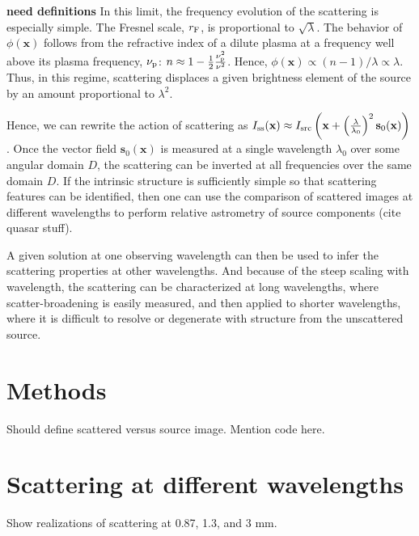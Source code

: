 \documentclass[11pt,preprint]{aastex}
\begin{document}
{\bf need definitions} In this limit, the frequency evolution of the scattering is especially simple. The Fresnel scale, $r_{\rm F}$, is proportional to $\sqrt{\lambda}$. The behavior of $\phi(\textbf{x})$ follows from the refractive index of a dilute plasma at a frequency well above its plasma frequency, $\nu_{\rm p}$: $n \approx 1 - \frac{1}{2} \frac{\nu_{\rm p}^2}{\nu^2}$. Hence, $\phi(\textbf{x}) \propto (n-1)/\lambda \propto \lambda$. Thus, in this regime, scattering displaces a given brightness element of the source by an amount proportional to $\lambda^2$. 

Hence, we can rewrite the action of scattering as 
$I_{\rm ss}(\textbf{x}) \approx I_{\rm src}\left( \textbf{x} + \left( \frac{\lambda}{\lambda_0} \right)^2 \textbf{s}_0(\textbf{x}) \right)$.  Once the vector 
field $\textbf{s}_0(\textbf{x})$ is measured at a single wavelength $\lambda_0$ 
over some angular domain $D$, the scattering can be inverted at all frequencies 
over the same domain $D$.  If the intrinsic structure is sufficiently simple so 
that scattering features can be identified, then one can use the comparison of 
scattered images at different wavelengths to perform relative astrometry of 
source components (cite quasar stuff). 

A given solution at one observing wavelength can then be used to infer the 
scattering properties at other wavelengths.  And because of the steep scaling 
with wavelength, the scattering can be characterized at long wavelengths, where 
scatter-broadening is easily measured, and then applied to shorter wavelengths, 
where it is difficult to resolve or degenerate with structure from the 
unscattered source.

\section{Methods}

Should define scattered versus source image.  Mention code here.

\section{Scattering at different wavelengths}

Show realizations of scattering at 0.87, 1.3, and 3 mm.

\begin{figure}[t!]
\end{figure}
\end{document}
